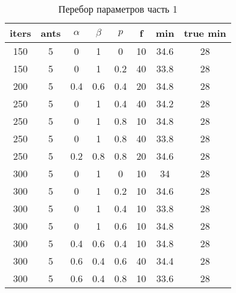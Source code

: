 \begin{table}[ph!]
  \begin{center}
    \captionsetup{justification=raggedright}
     \caption{Перебор параметров часть 1}
    \label{tab:workcost_classic}
    \begin{tabular}{c|c|c|c|c|c|c|c}
      \textbf{iters} & \textbf{ants}  & \textbf{$\alpha$}  & \textbf{$\beta$} & \textbf{$p$} & \textbf{f}  & \textbf{min}  & \textbf{true min}\\
      \hline	
	150 & 5 & 0 & 1 & 0 & 10 & 34.6 & 28\\
	150 & 5 & 0 & 1 & 0.2 & 40 & 33.8 & 28\\
	200 & 5 & 0.4 & 0.6 & 0.4 & 20 & 34.8 & 28\\
	250 & 5 & 0 & 1 & 0.4 & 40 & 34.2 & 28\\
	250 & 5 & 0 & 1 & 0.8 & 10 & 34.8 & 28\\
	250 & 5 & 0 & 1 & 0.8 & 40 & 33.8 & 28\\
	250 & 5 & 0.2 & 0.8 & 0.8 & 20 & 34.6 & 28\\
	300 & 5 & 0 & 1 & 0 & 10 & 34 & 28\\
	300 & 5 & 0 & 1 & 0.2 & 10 & 34.6 & 28\\
	300 & 5 & 0 & 1 & 0.4 & 10 & 33.8 & 28\\
	300 & 5 & 0 & 1 & 0.6 & 10 & 34.8 & 28\\
	300 & 5 & 0.4 & 0.6 & 0.4 & 10 & 34.8 & 28\\
	300 & 5 & 0.6 & 0.4 & 0.6 & 40 & 34.4 & 28\\
	300 & 5 & 0.6 & 0.4 & 0.8 & 10 & 33.6 & 28\\
    \end{tabular}
  \end{center}
\end{table}


